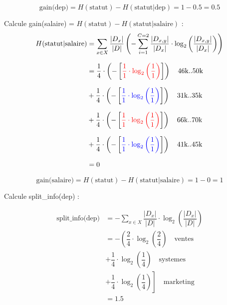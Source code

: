 \documentclass{article}
\begin{document}
\[\text{gain(dep)} = H(\text{statut}) - H(\text{statut} | \text{dep}) = 1 - 0.5 = 0.5\]


\vspace{0.45cm}

Calcule gain(salaire) = $H(\text{statut}) - H(\text{statut} | \text{salaire})$ :
\begin{align*}
    H(\text{statut} | \text{salaire}) &= \sum_{x\in X} \dfrac{|D_x|}{|D|} \left( - \sum_{i=1} ^{C=2} \dfrac{|D_{x,y}|}{|D_x|} \cdot \log_2 \left( \dfrac{|D_{x,y}|}{|D_x|} \right) \right)\\[0.25cm]
                                  &= \dfrac{1}{4} \cdot \left( - \left[  \textcolor{red}{\dfrac{1}{1} \cdot \log_2\left (\dfrac{1}{1} \right)} \right]  \right) \quad \text{46k..50k}\\[0.25cm]
                                  &+ \dfrac{1}{4} \cdot \left( - \left[ \textcolor{blue}{\dfrac{1}{1} \cdot \log_2\left (\dfrac{1}{1} \right)}  \right]  \right) \quad \text{31k..35k}\\[0.25cm]
                                  &+ \dfrac{1}{4} \cdot \left( - \left[ \textcolor{red}{\dfrac{1}{1} \cdot \log_2\left (\dfrac{1}{1} \right)}  \right]  \right) \quad \text{66k..70k}\\[0.25cm]
                                  &+ \dfrac{1}{4} \cdot \left( - \left[ \textcolor{blue}{\dfrac{1}{1} \cdot \log_2\left (\dfrac{1}{1} \right)}  \right]  \right) \quad \text{41k..45k}\\[0.25cm]
                                  & = 0
\end{align*}


\vspace{-0.15cm}

\[\text{gain(salaire)} = H(\text{statut}) - H(\text{statut} | \text{salaire}) = 1 - 0 = 1\]

\newpage
Calcule split\_info(dep) :

\vspace{-0.5cm}

\begin{align*}
    \text{split\_info(dep)} &= - \sum_{x \in X} \dfrac{|D_x|}{|D|} \cdot \log_2\left( \dfrac{|D_x|}{|D|} \right) \\[0.25cm]
                            &= - \left( \dfrac{2}{4} \cdot  \log_2\left( \dfrac{2}{4} \right) \quad \text{ventes} \right. \\[0.25cm]
                            &+ \dfrac{1}{4} \cdot  \log_2\left( \dfrac{1}{4} \right) \quad \text{systemes} \\[0.25cm]
                            &+ \left. \dfrac{1}{4} \cdot  \log_2\left( \dfrac{1}{4} \right) \right]\quad \text{marketing} \\[0.25cm]
                            & = 1.5
\end{align*}
\end{document}
